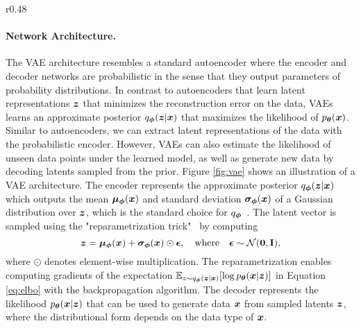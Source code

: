 \begin{comment}
\begin{figure}[t]
	\centering
	\resizebox{0.6\textwidth}{!}{
		
	}
	\caption{Illustration of a VAE. 
	}
	\label{fig:vae1}
	\vspace{-3mm}
\end{figure}	
\end{comment}


\vspace{-3mm}
\begin{wrapfigure}{r}{0.48\textwidth}
	\centering
	\vspace{-2mm}
	\resizebox{0.45\textwidth}{!}{
		
	}
	\vspace{-2mm}
	\captionsetup{width=.95\linewidth}
	\caption{Illustration of a variational autoencoder with the reparameterization trick equation.  
	}
	\label{fig:vae}
	\vspace{-3mm}
\end{wrapfigure}
\paragraph{Network Architecture.} The VAE architecture resembles a standard autoencoder where the encoder and decoder networks are probabilistic in the sense that they output parameters of probability distributions. In contrast to autoencoders that learn latent representations ${\bm{z}}$ that minimizes the reconstruction error on the data, VAEs learns an approximate posterior $q_{{\bm{\phi}}}({\bm{z}} | {\bm{x}})$ that maximizes the likelihood of $p_{{\bm{\theta}}}({\bm{x}})$. Similar to autoencoders, we can extract latent representations of the data with the probabilistic encoder. However, VAEs can also estimate the likelihood of unseen data points under the learned model, as well as generate new data by decoding latents sampled from the prior. 
Figure \ref{fig:vae} shows an illustration of a VAE architecture. The encoder represents the approximate posterior $q_{{\bm{\phi}}}({\bm{z}} | {\bm{x}})$ which outputs the mean ${\bm{\mu}}_{{\bm{\phi}}}({\bm{x}})$ and standard deviation ${\bm{\sigma}}_{{\bm{\phi}}}({\bm{x}})$ of a Gaussian distribution over ${\bm{z}}$, which is the standard choice for $q_{{\bm{\phi}}}$~\cite{kingma2013auto}. The latent vector is sampled using the "reparametrization trick"~\cite{rezende2014stochastic, kingma2013auto} by computing 
\begin{equation}
	{\bm{z}} = {\bm{\mu}}_{{\bm{\phi}}}({\bm{x}}) + {\bm{\sigma}}_{{\bm{\phi}}}({\bm{x}}) \odot {\bm{\epsilon}}, \quad \text{where} \quad {\bm{\epsilon}} \sim {\mathcal{N}}(\bm{0}, \mathbf{I}),
\end{equation}
where $\odot$ denotes element-wise multiplication. The reparametrization enables computing gradients of the expectation $\mathbb{E}_{z \sim q_{{\bm{\phi}}}({\bm{z}} | {\bm{x}})}[\log p_{{\bm{\theta}}}({\bm{x}} | {\bm{z}})]$ in Equation \ref{eq:elbo} with the backpropagation algorithm. The decoder represents the likelihood $p_{{\bm{\theta}}}({\bm{x}} | {\bm{z}})$ that can be used to generate data ${\bm{x}}$ from sampled latents ${\bm{z}}$, where the distributional form depends on the data type of ${\bm{x}}$. 

